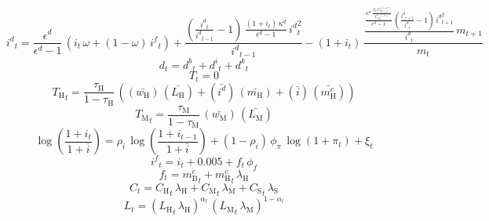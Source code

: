 \begin{dmath}
{i^d}_{t}=\frac{{\epsilon^d}}{{\epsilon^d}-1}\, \left({i}_{t}\, {\omega}+\left(1-{\omega}\right)\, {i^f}_{t}\right)+\frac{\left(\frac{{i^d}_{t}}{{i^d}_{t-1}}-1\right)\, \frac{\left(1+{i}_{t}\right)\, {\kappa^d}}{{\epsilon^d}-1}\, {i^d}_{t}^{2}}{{i^d}_{t-1}}-\left(1+{i}_{t}\right)\, \frac{\frac{\frac{{\kappa^d}\, \frac{{\beta_\mathrm{S}}\, {C_\mathrm{S}}_{t+1}^{\left(-{\sigma}\right)}}{{C_\mathrm{S}}_{t}^{\left(-{\sigma}\right)}}}{{\epsilon^d}-1}\, \left(\frac{{i^d}_{t+1}}{{i^d}_{t}}-1\right)\, {i^d}_{t+1}^{2}}{{i^d}_{t}}\, {m}_{t+1}}{{m}_{t}}
\end{dmath}
\begin{dmath}
{d}_{t}={d^b}_{t}+{d^i}_{t}+{d^k}_{t}
\end{dmath}
\begin{dmath}
{T}_{t}=0
\end{dmath}
\begin{dmath}
{T_\mathrm{H}}_{t}=\frac{{\tau_\mathrm{H}}}{1-{\tau_\mathrm{H}}}\, \left((\bar{w_\mathrm{H}})\, (\bar{L_\mathrm{H}})+(\bar{i^d})\, (\bar{m_\mathrm{H}})+(\bar{i})\, (\bar{m^c_\mathrm{H}})\right)
\end{dmath}
\begin{dmath}
{T_\mathrm{M}}_{t}=\frac{{\tau_\mathrm{M}}}{1-{\tau_\mathrm{M}}}\, (\bar{w_\mathrm{M}})\, (\bar{L_\mathrm{M}})
\end{dmath}
\begin{dmath}
\log\left(\frac{1+{i}_{t}}{1+{\bar{i}}}\right)={\rho_i}\, \log\left(\frac{1+{i}_{t-1}}{1+{\bar{i}}}\right)+\left(1-{\rho_i}\right)\, {\phi_\pi}\, \log\left(1+{\pi}_{t}\right)+{\xi}_{t}
\end{dmath}
\begin{dmath}
{i^f}_{t}={i}_{t}+0.005+{f}_{t}\, {\phi_f}
\end{dmath}
\begin{dmath}
{f}_{t}={m^c_\mathrm{B}}_{t}+{m^c_\mathrm{H}}_{t}\, {\lambda_\mathrm{H}}
\end{dmath}
\begin{dmath}
{C}_{t}={C_\mathrm{H}}_{t}\, {\lambda_\mathrm{H}}+{C_\mathrm{M}}_{t}\, {\lambda_\mathrm{M}}+{C_\mathrm{S}}_{t}\, {\lambda_\mathrm{S}}
\end{dmath}
\begin{dmath}
{L}_{t}=\left({L_\mathrm{H}}_{t}\, {\lambda_\mathrm{H}}\right)^{{\alpha_l}}\, \left({L_\mathrm{M}}_{t}\, {\lambda_\mathrm{M}}\right)^{1-{\alpha_l}}
\end{dmath}
